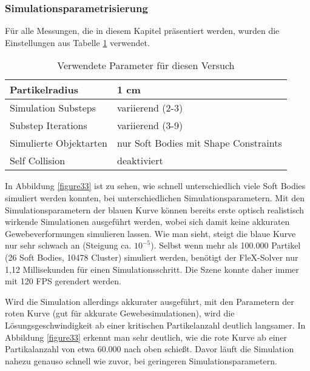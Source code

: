 \subsubsection{Simulationsparametrisierung}

Für alle Messungen, die in diesem Kapitel präsentiert werden, wurden die Einstellungen aus Tabelle \ref{table_soft_param} verwendet.

\begin{table}[hbt!]
\centering
\caption{Verwendete Parameter für diesen Versuch}
\label{table_soft_param}
\begin{tabular}{l|l}
 \hline
Partikelradius & 1 cm  \\ \hline
Simulation Substeps & variierend (2-3)      \\ \hline
Substep Iterations & variierend (3-9)            \\ \hline
Simulierte Objektarten &  nur Soft Bodies mit Shape Constraints\\ \hline
Self Collision & deaktiviert \\ \hline%
\end{tabular}
\end{table}


In Abbildung \ref{figure33} ist zu sehen, wie schnell unterschiedlich viele Soft Bodies simuliert werden konnten, bei unterschiedlichen Simulationsparametern. %
Mit den Simulationsparametern der blauen Kurve können bereits erste optisch realistisch wirkende Simulationen ausgeführt werden, wobei sich damit keine akkuraten Gewebeverformungen simulieren lassen. Wie man sieht, steigt die blaue Kurve nur sehr schwach an (Steigung ca. $10^{-5}$). Selbst wenn mehr als 100.000 Partikel (26 Soft Bodies, 10478 Cluster) simuliert werden, benötigt der FleX-Solver nur 1,12 Millisekunden für einen Simulationsschritt. Die Szene konnte daher immer mit 120 FPS gerendert werden.
{}

Wird die Simulation allerdings akkurater ausgeführt, mit den Parametern der roten Kurve (gut für akkurate Gewebesimulationen), wird die Lösungsgeschwindigkeit ab einer kritischen Partikelanzahl deutlich langsamer. In Abbildung \ref{figure33} erkennt man sehr deutlich, wie die rote Kurve ab einer Partikalanzahl von etwa 60.000 nach oben schießt. Davor läuft die Simulation nahezu genauso schnell wie zuvor, bei geringeren Simulationsparametern.

